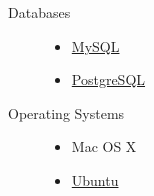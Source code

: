 \begin{description}
\begin{itemize}
    \end{itemize}
  \item[Databases] \hfill
    \begin{itemize}
      \item \href{http://www.mysql.com}{MySQL}
      \item \href{http://www.postgresql.org}{PostgreSQL}
    \end{itemize}
  \item[Operating Systems] \hfill
    \begin{itemize}
      \item Mac OS X
      \item \href{http://www.ubuntu.com}{Ubuntu}
    \end{itemize}
\end{description}
